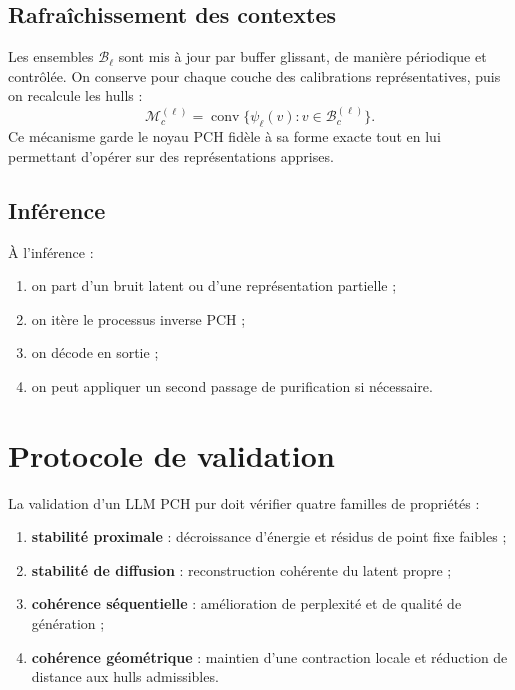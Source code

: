 \documentclass[11pt]{article}
\begin{document}
\subsection{Rafraîchissement des contextes}

Les ensembles \(\mathcal B_\ell\) sont mis à jour par buffer glissant, de manière périodique et contrôlée.
On conserve pour chaque couche des calibrations représentatives, puis on recalcule les hulls :
\[
\mathcal M_c^{(\ell)}
=
\operatorname{conv}\{\psi_\ell(v): v\in\mathcal B_c^{(\ell)}\}.
\]
Ce mécanisme garde le noyau PCH fidèle à sa forme exacte tout en lui permettant d'opérer sur des représentations apprises.

\subsection{Inférence}

À l'inférence :
\begin{enumerate}[leftmargin=2em]
    \item on part d'un bruit latent ou d'une représentation partielle ;
    \item on itère le processus inverse PCH ;
    \item on décode en sortie ;
    \item on peut appliquer un second passage de purification si nécessaire.
\end{enumerate}

\section{Protocole de validation}

La validation d'un LLM PCH pur doit vérifier quatre familles de propriétés :

\begin{enumerate}[leftmargin=2em]
    \item \textbf{stabilité proximale} :
    décroissance d'énergie et résidus de point fixe faibles ;
    \item \textbf{stabilité de diffusion} :
    reconstruction cohérente du latent propre ;
    \item \textbf{cohérence séquentielle} :
    amélioration de perplexité et de qualité de génération ;
    \item \textbf{cohérence géométrique} :
    maintien d'une contraction locale et réduction de distance aux hulls admissibles.
\end{enumerate}
\end{document}
